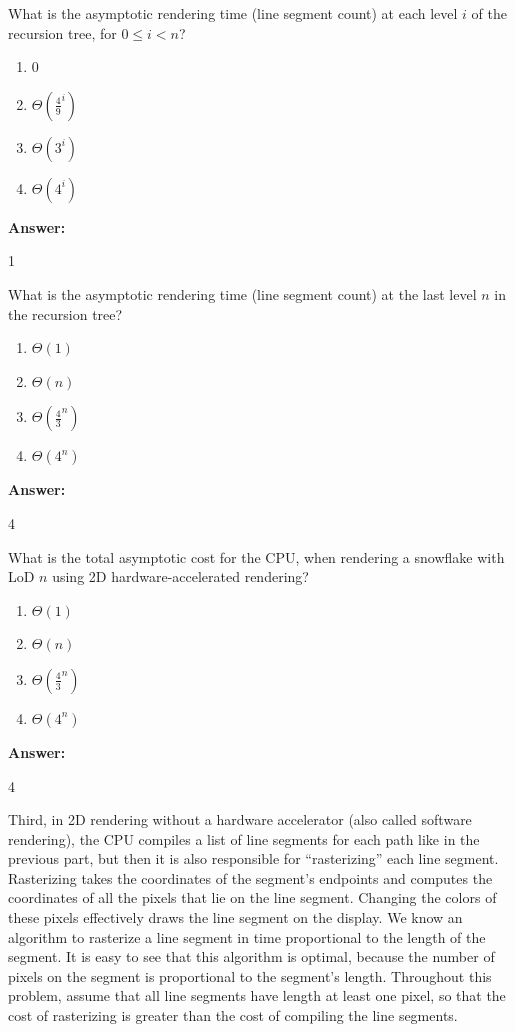 \documentclass[12pt,twoside]{article}
\newcommand{\answer}{
	\par\medskip
	\textbf{Answer:}
}
\newcommand{\answerIj}{ \answer
	1
}
\newcommand{\answerIk}{ \answer
	4
}
\newcommand{\answerIl}{ \answer
	4
}
\begin{document}
\begin{problems}
\begin{problemparts}
		\problempart {} What is the asymptotic rendering time (line segment count) at
		each level $i$ of the recursion tree, for $0 \le i < n$?
		\begin{enumerate}
			\item 0
			\item $\Theta(\frac{4}{9} ^ i)$
			\item $\Theta(3 ^ i)$
			\item $\Theta(4 ^ i)$
		\end{enumerate}
		\answerIj

		\problempart {} What is the asymptotic rendering time (line segment count) at
		the last level $n$ in the recursion tree?
		\begin{enumerate}
			\item $\Theta(1)$
			\item $\Theta(n)$
			\item $\Theta(\frac{4}{3}^n)$
			\item $\Theta(4^n)$
		\end{enumerate}
		\answerIk

		\problempart {} What is the total asymptotic cost for the CPU, when rendering
		a snowflake with LoD $n$ using 2D hardware-accelerated rendering?
		\begin{enumerate}
			\item $\Theta(1)$
			\item $\Theta(n)$
			\item $\Theta(\frac{4}{3}^n)$
			\item $\Theta(4^n)$
		\end{enumerate}
		\answerIl

	\end{problemparts}

	Third, in 2D rendering without a hardware accelerator (also called
	software rendering), the CPU compiles a list of line segments for each path like
	in the previous part, but then it is also responsible for ``rasterizing'' each
	line segment. Rasterizing takes the coordinates of the segment's endpoints and
	computes the coordinates of all the pixels that lie on the line segment.
	Changing the colors of these pixels effectively draws the line segment on the
	display. We know an algorithm to rasterize a line segment in time proportional
	to the length of the segment. It is easy to see that this algorithm is optimal,
	because the number of pixels on the segment is proportional to the segment's
	length. Throughout this problem, assume that all line segments have length
	at least one pixel, so that the cost of rasterizing is greater than the cost
	of compiling the line segments.


\end{problems}
\end{document}
